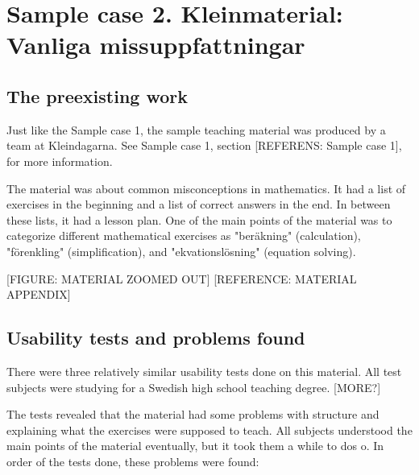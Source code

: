 \section{Sample case 2. Kleinmaterial: Vanliga missuppfattningar}

\subsection{The preexisting work}

Just like the Sample case 1, the sample teaching material was produced by a team at Kleindagarna. See Sample case 1, section [REFERENS: Sample case 1], for more information.

The material was about common misconceptions in mathematics. It had a list of exercises in the beginning and a list of correct answers in the end. In between these lists, it had a lesson plan. One of the main points of the material was to categorize different mathematical exercises as "beräkning" (calculation), "förenkling" (simplification), and "ekvationslösning" (equation solving).

[FIGURE: MATERIAL ZOOMED OUT]
[REFERENCE: MATERIAL APPENDIX]

\subsection{Usability tests and problems found}

There were three relatively similar usability tests done on this material. All test subjects were studying for a Swedish high school teaching degree. [MORE?]

The tests revealed that the material had some problems with structure and explaining what the exercises were supposed to teach. All subjects understood the main points of the material eventually, but it took them a while to dos o. In order of the tests done, these problems were found:

